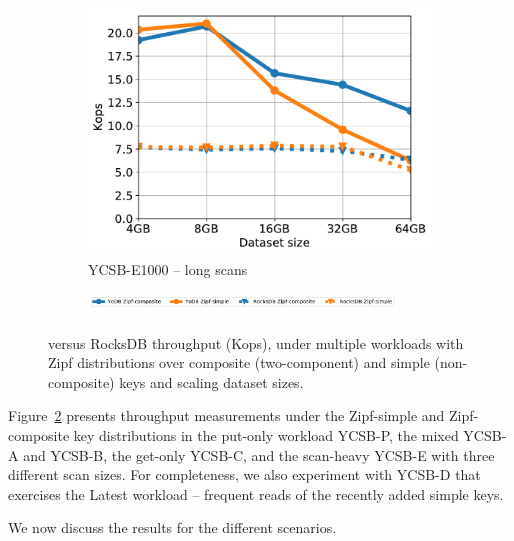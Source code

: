 \begin{figure}[tb]
\begin{subfigure}{0.33\linewidth}
\includegraphics[width=\textwidth]{figs/Workload_E+_line.pdf}
\caption{YCSB-E1000 -- long scans}
\label{fig:throughput:e1000}
\end{subfigure}
\begin{subfigure}{\linewidth}
\centerline{
\includegraphics[width=0.9\textwidth]{figs/legend.pdf}
\vspace{-5mm}
}
\end{subfigure}
\caption{
{\sys\/ versus RocksDB throughput (Kops), under multiple workloads with Zipf distributions over composite (two-component) and
simple (non-composite) keys and scaling dataset sizes.}
}
\label{fig:throughput}
\end{figure}

Figure~\ref{fig:throughput} presents throughput measurements under the Zipf-simple and 
Zipf-composite key distributions in the put-only workload YCSB-P, the mixed YCSB-A and YCSB-B, 
the get-only YCSB-C, and the scan-heavy YCSB-E with three different scan 
sizes. 
For completeness, we also experiment with YCSB-D that exercises the 
Latest workload -- frequent reads of the recently added simple keys. 

We now discuss the results for the different scenarios.

  
